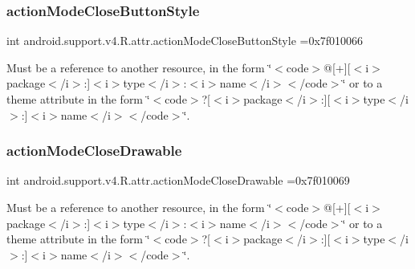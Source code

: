 \subsubsection{\texorpdfstring{action\+Mode\+Close\+Button\+Style}{actionModeCloseButtonStyle}}
{\footnotesize\ttfamily int android.\+support.\+v4.\+R.\+attr.\+action\+Mode\+Close\+Button\+Style =0x7f010066\hspace{0.3cm}{\ttfamily [static]}}

Must be a reference to another resource, in the form \char`\"{}$<$code$>$@\mbox{[}+\mbox{]}\mbox{[}$<$i$>$package$<$/i$>$\+:\mbox{]}$<$i$>$type$<$/i$>$\+:$<$i$>$name$<$/i$>$$<$/code$>$\char`\"{} or to a theme attribute in the form \char`\"{}$<$code$>$?\mbox{[}$<$i$>$package$<$/i$>$\+:\mbox{]}\mbox{[}$<$i$>$type$<$/i$>$\+:\mbox{]}$<$i$>$name$<$/i$>$$<$/code$>$\char`\"{}. \mbox{\label{classandroid_1_1support_1_1v4_1_1R_1_1attr_ad3242ecccbfe30007483999e176047de}} 
\subsubsection{\texorpdfstring{action\+Mode\+Close\+Drawable}{actionModeCloseDrawable}}
{\footnotesize\ttfamily int android.\+support.\+v4.\+R.\+attr.\+action\+Mode\+Close\+Drawable =0x7f010069\hspace{0.3cm}{\ttfamily [static]}}

Must be a reference to another resource, in the form \char`\"{}$<$code$>$@\mbox{[}+\mbox{]}\mbox{[}$<$i$>$package$<$/i$>$\+:\mbox{]}$<$i$>$type$<$/i$>$\+:$<$i$>$name$<$/i$>$$<$/code$>$\char`\"{} or to a theme attribute in the form \char`\"{}$<$code$>$?\mbox{[}$<$i$>$package$<$/i$>$\+:\mbox{]}\mbox{[}$<$i$>$type$<$/i$>$\+:\mbox{]}$<$i$>$name$<$/i$>$$<$/code$>$\char`\"{}. \mbox{\label{classandroid_1_1support_1_1v4_1_1R_1_1attr_af82835da89e3dbfb288ee7fd390bcb60}} 
